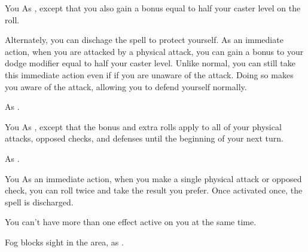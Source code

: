 \begin{spelltarget}{You}
    \spelleffect As , except that you also gain a bonus equal to half your caster level on the roll.
    
    Alternately, you can dischage the spell to protect yourself. As an immediate action, when you are attacked by a physical attack, you can gain a bonus to your dodge modifier equal to half your caster level. Unlike normal, you can still take this immediate action even if if you are unaware of the attack. Doing so makes you aware of the attack, allowing you to defend yourself normally.
\end{spelltarget}
\spellnotes As .

\begin{spelltarget}{You}
    \spelleffect As , except that the bonus and extra rolls apply to all of your physical attacks, opposed checks, and defenses until the beginning of your next turn.
\end{spelltarget}
\spellnotes As .

\begin{spelltarget}{You}
    \spelleffect As an immediate action, when you make a single physical attack or opposed check, you can roll twice and take the result you prefer. Once activated once, the spell is discharged.
\end{spelltarget}
\spellnotes You can't have more than one  effect active on you at the same time.

\begin{comment}
\subsubsection{O-P}
\end{comment}

\spelldur{\durshort}
\spellline
\spelleffect Fog blocks sight in the area, as .
\spellnotes \fogspellnotes

